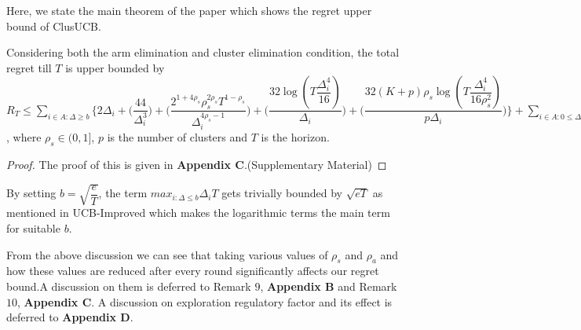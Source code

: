 	
	Here, we state the main theorem of the paper which shows the regret upper bound of ClusUCB.
	
\begin{theorem}
Considering both the arm elimination and cluster elimination condition, the total regret till $T$ is upper bounded by $R_{T}\leq \sum_{i\in A:\Delta\geq b} \bigg\lbrace 2\Delta_{i}+ \bigg(\dfrac{44}{\Delta_{i}^{3}}\bigg) + \bigg(\dfrac{2^{1+4\rho_{s}}\rho_{s}^{2\rho_{s}}T^{1-\rho_{s}}}{\Delta_{i}^{4\rho_{s}-1}}\bigg) + \bigg(\dfrac{32\log{(T\dfrac{\Delta_{i}^{4}}{16})}}{\Delta_{i}}\bigg) + \bigg(\dfrac{32(K+p)\rho_{s}\log{(T\dfrac{\Delta_{i}^{4}}{16\rho_{s}^{2}})}}{p\Delta_{i}}\bigg)\bigg\rbrace + \sum_{i\in A:0\leq\Delta_{i}\leq b}\bigg\lbrace \bigg(\dfrac{12}{b^{3}} \bigg) + \bigg(\dfrac{T^{1-\rho_{s}}\rho_{s}^{2\rho_{s}}2^{2\rho_{s}+\frac{3}{2}}}{\Delta_{i}^{4\rho_{s}-1}} \bigg)+\bigg(\dfrac{T^{1-\rho_{s}}\rho_{s}^{2\rho_{s}}2^{2\rho_{s}+\frac{3}{2}}}{b^{4\rho_{s} -1}} \bigg) \bigg\rbrace + max_{i:\Delta\leq b}\Delta_{i}T $, where $\rho_{s}\in (0,1]$, $p$ is the number of clusters and $T$ is the horizon.
\end{theorem}

\begin{proof}
	The proof of this is given in \textbf{Appendix C}.(Supplementary Material)
\end{proof}

\begin{remark}
By setting $b=\sqrt{\dfrac{e}{T}}$, the term $max_{i:\Delta\leq b}\Delta_{i}T$ gets trivially bounded by $\sqrt{eT}$ as mentioned in UCB-Improved which makes the logarithmic terms the main term for suitable $b$. 
\end{remark}

\begin{remark}
From the above discussion we can see that taking various values of $\rho_{s}$ and $\rho_{a}$ and how these values are reduced after every round significantly affects our regret bound.A discussion on them is deferred to Remark $9$, \textbf{Appendix B} and Remark $10$, \textbf{Appendix C}. A discussion on exploration regulatory factor and its effect is deferred to \textbf{Appendix D}.
\end{remark}

